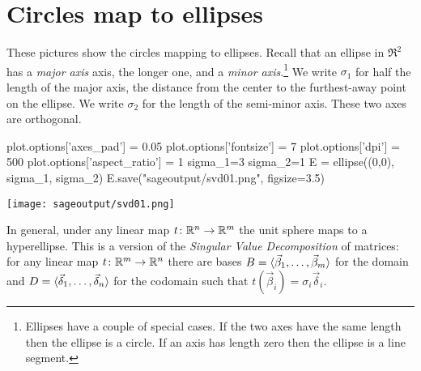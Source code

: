 \section{Circles map to ellipses}
These pictures show the circles mapping to ellipses.
Recall that an ellipse in $\Re^2$ has a \textit{major axis} axis, 
the longer one, and a 
\textit{minor axis}.\footnote{Ellipses have a couple of special cases.
If the two axes have the same length then the ellipse is a circle.
If an axis has length zero then the ellipse is a line segment.}
We write $\sigma_1$ for half the length of the major axis, 
the distance from the center to the furthest-away point on the ellipse.
We write $\sigma_2$ for the length of the semi-minor axis.
These two axes are orthogonal.
\begin{sageoutput}
plot.options['axes_pad'] = 0.05
plot.options['fontsize'] = 7
plot.options['dpi'] = 500
plot.options['aspect_ratio'] = 1
sigma_1=3
sigma_2=1
E = ellipse((0,0), sigma_1, sigma_2)
E.save("sageoutput/svd01.png", figsize=3.5)
\end{sageoutput}
\begin{center}
  \texttt{[image: sageoutput/svd01.png]}
\end{center}


In general, under any linear map $\mbox{$t\colon \mathbb{R}^n\to \mathbb{R}^m$}$ the 
unit sphere maps to a hyperellipse.
This is a version of the \textit{Singular Value Decomposition} of
matrices:
for any linear map $\mbox{$t\colon \mathbb{R}^m\to \mathbb{R}^n$}$ there are bases
$B=\langle\vec{\beta}_1,\ldots,\vec{\beta}_m\rangle$ for the domain and
$D=\langle\vec{\delta}_1,\ldots,\vec{\delta}_n\rangle$ for the codomain
such that $t(\vec{\beta}_i)=\sigma_i\vec{\delta}_i$.

